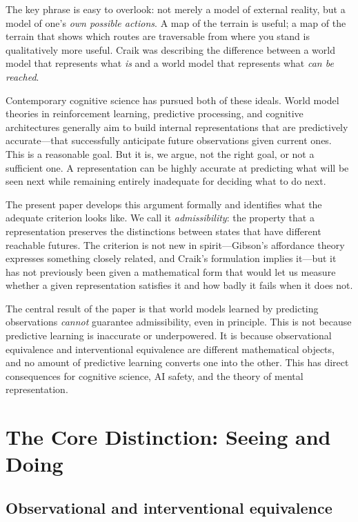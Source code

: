 \documentclass[11pt,a4paper]{article}
\begin{document}
The key phrase is easy to overlook: not merely a model of external reality, but
a model of one's \emph{own possible actions}. A map of the terrain is useful;
a map of the terrain that shows which routes are traversable from where you stand
is qualitatively more useful. Craik was describing the difference between a
world model that represents what \emph{is} and a world model that represents
what \emph{can be reached}.

Contemporary cognitive science has pursued both of these ideals. World model
theories in reinforcement learning, predictive processing, and cognitive
architectures generally aim to build internal representations that are predictively
accurate---that successfully anticipate future observations given current ones.
This is a reasonable goal. But it is, we argue, not the right goal, or not a
sufficient one. A representation can be highly accurate at predicting what will
be seen next while remaining entirely inadequate for deciding what to do next.

The present paper develops this argument formally and identifies what the adequate
criterion looks like. We call it \emph{admissibility}: the property that a
representation preserves the distinctions between states that have different
reachable futures. The criterion is not new in spirit---Gibson's \citeyearpar{gibson1979ecological}
affordance theory expresses something closely related, and Craik's formulation
implies it---but it has not previously been given a mathematical form that would
let us measure whether a given representation satisfies it and how badly it fails
when it does not.

The central result of the paper is that world models learned by predicting
observations \emph{cannot} guarantee admissibility, even in principle. This is
not because predictive learning is inaccurate or underpowered. It is because
observational equivalence and interventional equivalence are different
mathematical objects, and no amount of predictive learning converts one into
the other. This has direct consequences for cognitive science, AI safety, and
the theory of mental representation.

\section{The Core Distinction: Seeing and Doing}

\subsection{Observational and interventional equivalence}
\end{document}
